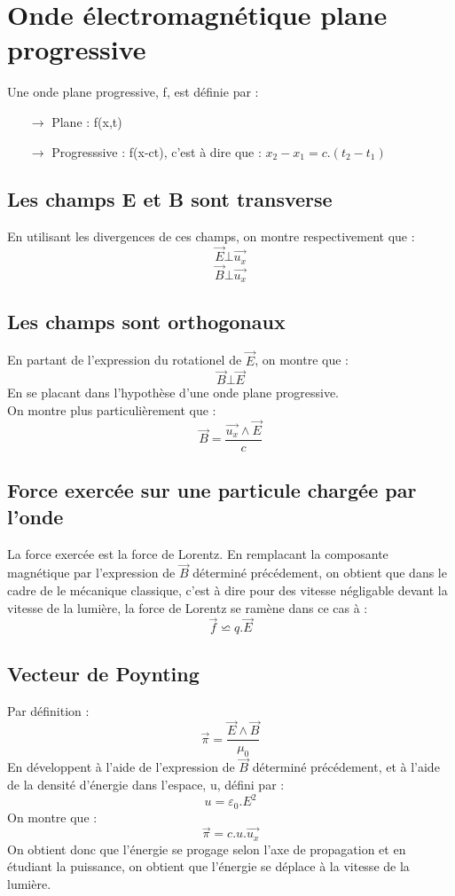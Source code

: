 \section{Onde électromagnétique plane progressive}
\begin{de}
Une onde plane progressive, f, est définie par : 
\begin{itemize}
 \item[$\rightarrow$] Plane : f(x,t)
 \item[$\rightarrow$] Progresssive : f(x-ct), c'est à dire que : $x_2 - x_1 = c.(t_2-t_1)$
\end{itemize}
\end{de}
\subsection{Les champs E et B sont transverse}
En utilisant les divergences de ces champs, on montre respectivement que : 
$$\overrightarrow{E}\bot \overrightarrow{u_x}$$
$$\overrightarrow{B} \bot \overrightarrow{u_x}$$
\subsection{Les champs sont orthogonaux}
En partant de l'expression du rotationel de $\overrightarrow{E}$, on montre que : 
$$\overrightarrow{B} \bot \overrightarrow{E}$$
En se placant dans l'hypothèse d'une onde plane progressive.\\
On montre plus particulièrement que :
$$\overrightarrow{B} = \dfrac{\overrightarrow{u_x} \wedge \overrightarrow{E}}{c}$$
\subsection{Force exercée sur une particule chargée par l'onde}
La force exercée est la force de Lorentz. En remplacant la composante magnétique par l'expression de $\overrightarrow{B}$ déterminé précédement, on obtient que dans le cadre de le mécanique classique, c'est à dire pour des vitesse négligable devant la vitesse de la lumière, la force de Lorentz se ramène dans ce cas à : 
$$\overrightarrow{f} \backsimeq q.\overrightarrow{E}$$
\subsection{Vecteur de Poynting}
Par définition : 
$$\overrightarrow{\pi} = \dfrac{\overrightarrow{E}\wedge\overrightarrow{B}}{\mu_0}$$
En développent à l'aide de l'expression de $\overrightarrow{B}$ déterminé précédement, et à l'aide de la densité d'énergie dans l'espace, u, défini par : 
$$u = \varepsilon_0.E^2$$
On montre que : 
$$\overrightarrow{\pi} = c.u.\overrightarrow{u_x}$$
On obtient donc que l'énergie se progage selon l'axe de propagation et en étudiant la puissance, on obtient que l'énergie se déplace à la vitesse de la lumière.
